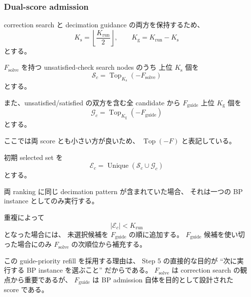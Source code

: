 \subsubsection{Dual-score admission}

correction search と decimation guidance の両方を保持するため、
\begin{equation}
    K_{\mathrm{s}}
    =
    \left\lfloor
    \frac{K_{\mathrm{run}}}{2}
    \right\rfloor,
    \qquad
    K_{\mathrm{g}}
    =
    K_{\mathrm{run}}-K_{\mathrm{s}}
\end{equation}
とする。

$F_{\mathrm{solve}}$ を持つ unsatisfied-check search nodes のうち
上位 $K_{\mathrm{s}}$ 個を
\begin{equation}
    \mathcal{S}_c
    =
    \operatorname{Top}_{K_{\mathrm{s}}}
    \left(
        -F_{\mathrm{solve}}
    \right)
\end{equation}
とする。

また、unsatisfied/satisfied の双方を含む全 candidate から
$F_{\mathrm{guide}}$ 上位 $K_{\mathrm{g}}$ 個を
\begin{equation}
    \mathcal{G}_c
    =
    \operatorname{Top}_{K_{\mathrm{g}}}
    \left(
        -F_{\mathrm{guide}}
    \right)
\end{equation}
とする。

ここでは両 score とも小さい方が良いため、
$\operatorname{Top}(-F)$ と表記している。

初期 selected set を
\begin{equation}
    \mathcal{E}_c
    =
    \operatorname{Unique}
    \left(
        \mathcal{S}_c
        \cup
        \mathcal{G}_c
    \right)
\end{equation}
とする。

両 ranking に同じ decimation pattern が含まれていた場合、
それは一つの BP instance としてのみ実行する。

重複によって
\begin{equation}
    |\mathcal{E}_c|<K_{\mathrm{run}}
\end{equation}
となった場合には、
未選択候補を $F_{\mathrm{guide}}$ の順に追加する。
$F_{\mathrm{guide}}$ 候補を使い切った場合にのみ
$F_{\mathrm{solve}}$ の次順位から補充する。

この guide-priority refill を採用する理由は、
Step 5 の直接的な目的が
``次に実行する BP instance を選ぶこと''
だからである。
$F_{\mathrm{solve}}$ は correction search の観点から重要であるが、
$F_{\mathrm{guide}}$ は BP admission 自体を目的として設計された score である。


